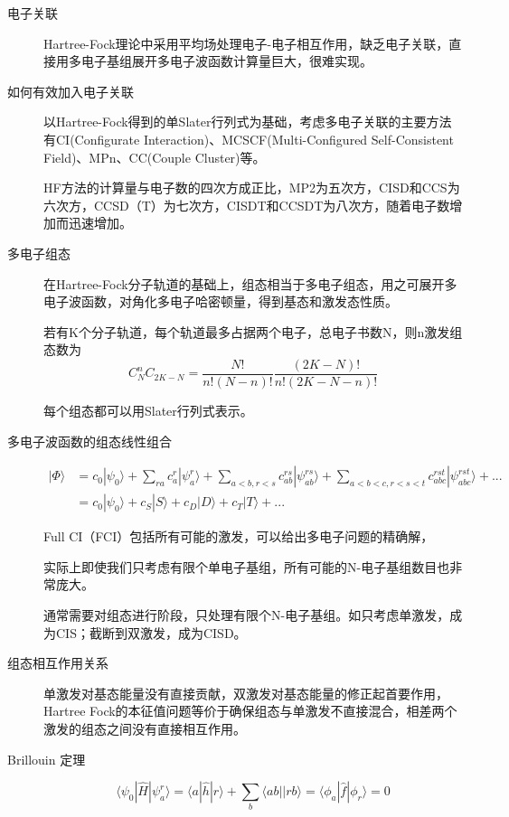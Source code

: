 \documentclass{article}
\numberwithin{equation}{section}
\newcommand{\bra}[1]{\langle #1 |}
\newcommand{\ket}[1]{| #1 \rangle}
\newcommand{\bracketl}[3]{\langle #1 | #2 | #3 \rangle}
\begin{document}
\begin{description}
	\item[电子关联] Hartree-Fock理论中采用平均场处理电子-电子相互作用，缺乏电子关联，直接用多电子基组展开多电子波函数计算量巨大，很难实现。

	\item[如何有效加入电子关联] 以Hartree-Fock得到的单Slater行列式为基础，考虑多电子关联的主要方法有CI(Configurate Interaction)、MCSCF(Multi-Configured Self-Consistent Field)、MPn、CC(Couple Cluster)等。

	HF方法的计算量与电子数的四次方成正比，MP2为五次方，CISD和CCS为六次方，CCSD（T）为七次方，CISDT和CCSDT为八次方，随着电子数增加而迅速增加。

	\item[多电子组态] 在Hartree-Fock分子轨道的基础上，组态相当于多电子组态，用之可展开多电子波函数，对角化多电子哈密顿量，得到基态和激发态性质。

	若有K个分子轨道，每个轨道最多占据两个电子，总电子书数N，则n激发组态数为
	\begin{equation}
	C_N^nC_{2K-N}=\frac{N!}{n!(N-n)!}\frac{(2K-N)!}{n!(2K-N-n)!}
	\end{equation}

	每个组态都可以用Slater行列式表示。


	\item[多电子波函数的组态线性组合]
	\begin{align*}
	\ket{\Phi} &= c_0\ket{\psi_0} +\sum_{ra}c_a^r\ket{\psi_a^r}+\sum_{a<b,r<s}c_{ab}^{rs}\ket{\psi_{ab}^{rs}}+\sum_{a<b<c,r<s<t}c^{rst}_{abc}\ket{\psi^{rst}_{abc}}+...\\
	&=c_0\ket{\psi_0} + c_S\ket{S}+c_D\ket{D}+c_T\ket{T}+...
	\end{align*}

	Full CI（FCI）包括所有可能的激发，可以给出多电子问题的精确解，

	实际上即使我们只考虑有限个单电子基组，所有可能的N-电子基组数目也非常庞大。

	通常需要对组态进行阶段，只处理有限个N-电子基组。如只考虑单激发，成为CIS；截断到双激发，成为CISD。


	\item[组态相互作用关系] 单激发对基态能量没有直接贡献，双激发对基态能量的修正起首要作用，Hartree Fock的本征值问题等价于确保组态与单激发不直接混合，相差两个激发的组态之间没有直接相互作用。

	\item[Brillouin 定理]
	\begin{equation}
	\bracketl{\psi_0}{\hat{H}}{\psi_a^r}=\bracketl{a}{\hat{h}}{r}+\sum_b\bra{ab}\ket{rb}=\bracketl{\phi_a}{\hat{f}}{\phi_r}=0
	\end{equation}


\end{description}
\end{document}
